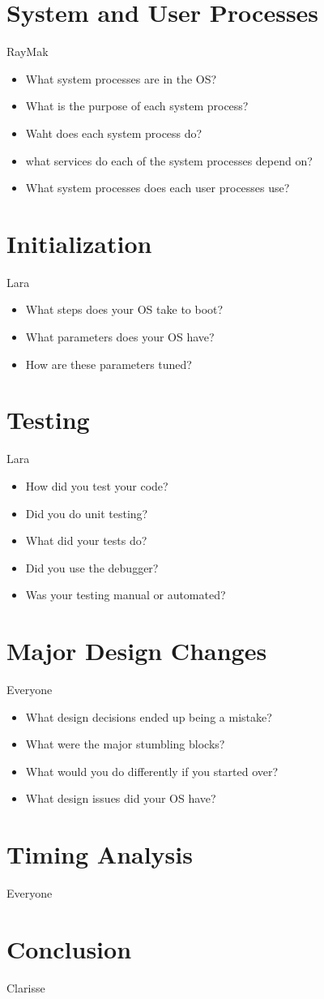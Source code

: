 \documentclass[11pt, oneside]{article}
\begin{document}
\section{System and User Processes}
RayMak
\begin{itemize}
\item What system processes are in the OS?
\item What is the purpose of each system process?
\item Waht does each system process do?
\item what services do each of the system processes depend on?
\item What system processes does each user processes use?
\end{itemize}

\section{Initialization}
Lara
\begin{itemize}
\item What steps does your OS take to boot?
\item What parameters does your OS have?
\item How are these parameters tuned?
\end{itemize}

\section{Testing}
Lara
\begin{itemize}
\item How did you test your code?
\item Did you do unit testing?
\item What did your tests do?
\item Did you use the debugger?
\item Was your testing manual or automated?
\end{itemize}

\section{Major Design Changes}
Everyone
\begin{itemize}
\item What design decisions ended up being a mistake?
\item What were the major stumbling blocks?
\item What would you do differently if you started over?
\item What design issues did your OS have?
\end{itemize}

\section{Timing Analysis}
Everyone

\section{Conclusion}
Clarisse
\end{document}
